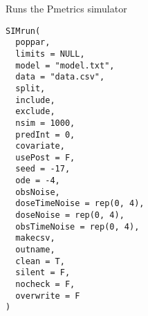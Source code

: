 \documentclass[a4paper]{book}
\begin{document}
%
\begin{SeeAlso}\relax
{}
\end{SeeAlso}
%
\begin{Description}\relax
Runs the Pmetrics simulator
\end{Description}
%
\begin{Usage}
\begin{verbatim}
SIMrun(
  poppar,
  limits = NULL,
  model = "model.txt",
  data = "data.csv",
  split,
  include,
  exclude,
  nsim = 1000,
  predInt = 0,
  covariate,
  usePost = F,
  seed = -17,
  ode = -4,
  obsNoise,
  doseTimeNoise = rep(0, 4),
  doseNoise = rep(0, 4),
  obsTimeNoise = rep(0, 4),
  makecsv,
  outname,
  clean = T,
  silent = F,
  nocheck = F,
  overwrite = F
)
\end{verbatim}
\end{Usage}
%
\end{document}
